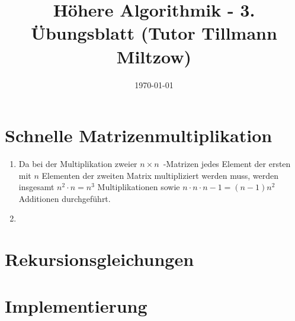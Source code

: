 \documentclass[a4paper,10pt]{scrartcl}
\title{H\"ohere Algorithmik - 3. \"Ubungsblatt (Tutor Tillmann Miltzow)}
\author{\Authors}
\date{\today}
\begin{document}
\maketitle

\section{Schnelle Matrizenmultiplikation}
\begin{enumerate}
\item	Da bei der Multiplikation zweier $n \times n$~-Matrizen jedes
	Element der ersten mit $n$ Elementen der zweiten Matrix
	multipliziert werden muss, werden insgesamt $n^2 \cdot n = n^3$
	Multiplikationen sowie $n \cdot n \cdot n-1 = (n-1)n^2$
	Additionen durchgeführt.

\item
\end{enumerate}

\section{Rekursionsgleichungen}

\section{Implementierung}
\end{document}
